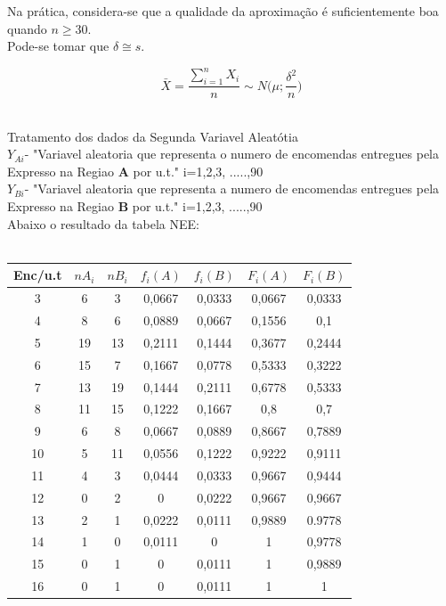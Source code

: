 \noindent
Na prática, considera-se que a qualidade da aproximação é suficientemente boa quando $n \geqslant 30$.  \\
Pode-se tomar que $\delta \cong s$. \\


%
\begin{minipage}{0pt}
\[\bar{X}=\frac{\sum_{i=1}^nX_i}{n}\sim N \big(\mu;\frac{\delta^2}{n}\big)\]
\end{minipage}\\
\newpage
\noindent
Tratamento dos dados da Segunda Variavel Aleatótia \\
$Y_{Ai}$- "Variavel aleatoria que representa o numero de encomendas entregues pela Expresso na Regiao \textbf{A} por u.t." \quad i=1,2,3, .....,90 \\
$Y_{Bi}$- "Variavel aleatoria que representa a numero de encomendas entregues pela Expresso na Regiao \textbf{B} por u.t." \quad i=1,2,3, .....,90 \\
Abaixo o resultado da tabela NEE:\\
\\
\begin{minipage}{0pt}
\begin{tabular}{ |c|c|c|c|c|c|c| }
\hline
Enc/u.t & $nA_i$ & $nB_i$ & $f_i(A)$	& $f_i(B)$ & $F_i(A)$ & $F_i(B)$ \\
\hline
3 & 6 & 3 & 0,0667 & 0,0333 & 0,0667 & 0,0333 \\
\hline
4 & 8 & 6 & 0,0889 & 0,0667 & 0,1556 & 0,1 \\
\hline
5 & 19 & 13 & 0,2111 & 0,1444 & 0,3677 & 0,2444 \\
\hline
6 & 15 & 7 & 0,1667 & 0,0778 & 0,5333 & 0,3222 \\
\hline
7 & 13 & 19 & 0,1444 & 0,2111 & 0,6778 & 0,5333 \\
\hline
8 & 11 & 15 & 0,1222 & 0,1667 & 0,8 & 0,7 \\
\hline
9 & 6 & 8 & 0,0667 & 0,0889 & 0,8667 & 0,7889 \\
\hline
10 & 5 & 11 & 0,0556 & 0,1222 & 0,9222 & 0,9111 \\
\hline
11 & 4 & 3 & 0,0444 & 0,0333 & 0,9667 & 0,9444 \\
\hline
12 & 0 & 2 & 0 & 0,0222 & 0,9667 & 0,9667 \\
\hline
13 & 2 & 1 & 0,0222 & 0,0111 & 0,9889 & 0.9778 \\
\hline
14 & 1 & 0 & 0,0111 & 0 & 1 & 0,9778 \\
\hline
15 & 0 & 1 & 0 & 0,0111 & 1 & 0,9889 \\
\hline
16 & 0 & 1 & 0 & 0,0111 & 1 & 1 \\
\hline
\end{tabular}
\end{minipage}
